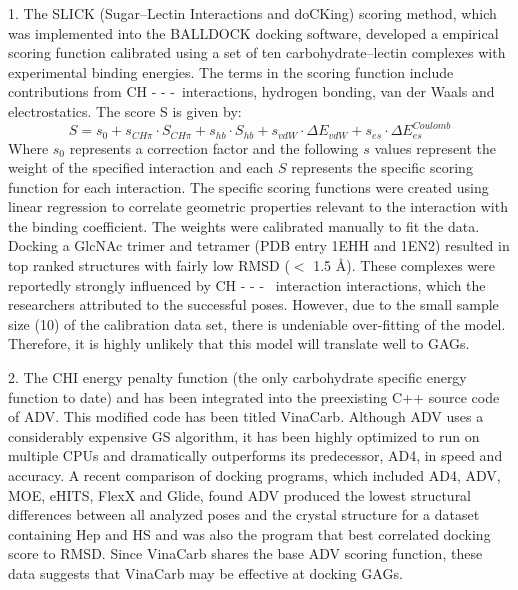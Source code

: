 \documentclass[journal=jctcce,manuscript=article]{achemso}
\begin{document}
{1. The SLICK (Sugar--Lectin Interactions and doCKing) scoring method, which was implemented into the BALLDOCK docking software, developed a empirical scoring function calibrated using a set of ten carbohydrate--lectin complexes with experimental binding energies.\cite{AndreasKerzmann2006SLICKInteractions, Kerzmann2008BALLDock/SLICK:Docking}
The terms in the scoring function include contributions from CH - - -\textpi~interactions, hydrogen bonding, van der Waals and electrostatics.\cite{Neumann2004ComputationalInteraction, AndreasKerzmann2006SLICKInteractions} The score S is given by:
\begin{equation} \label{eq:1}
S = s_0 + s_{CH\pi}\cdot S_{CH\pi} + s_{hb}\cdot S_{hb} + s_{vdW}\cdot \Delta E_{vdW} + s_{es}\cdot \Delta E_{es}^{Coulomb}
\end{equation}
Where $s_{0}$ represents a correction factor and the following $s$ values represent the weight of the specified interaction and each $S$ represents the specific scoring function for each interaction.\cite{AndreasKerzmann2006SLICKInteractions} The specific scoring functions were created using linear regression to correlate geometric properties relevant to the interaction with the binding coefficient.\cite{AndreasKerzmann2006SLICKInteractions, Kerzmann2008BALLDock/SLICK:Docking}
The weights were calibrated manually to fit the data.\cite{AndreasKerzmann2006SLICKInteractions}
Docking a GlcNAc trimer and tetramer (PDB entry 1EHH and 1EN2) resulted in top ranked structures with fairly low RMSD ($<$ 1.5 \AA).\cite{AndreasKerzmann2006SLICKInteractions, Kerzmann2008BALLDock/SLICK:Docking} 
These complexes were reportedly strongly influenced by CH - - - \textpi~interaction interactions, which the researchers attributed to the successful poses.\cite{AndreasKerzmann2006SLICKInteractions, Kerzmann2008BALLDock/SLICK:Docking}
However, due to the small sample size (10) of the calibration data set, there is undeniable over-fitting of the model.\cite{AndreasKerzmann2006SLICKInteractions, Kerzmann2008BALLDock/SLICK:Docking}
Therefore, it is highly unlikely that this model will translate well to \acp{GAG}.\cite{Samsonov2016ComputationalComplexes}

2. The \ac{CHI} energy penalty function (the only carbohydrate specific energy function to date) and has been integrated into the preexisting C++ source code of \ac{ADV}.\cite{Nivedha2015CarbohydrateChaff, Nivedha2016Vina-Carb:Docking} This modified code has been titled VinaCarb. Although \ac{ADV} uses a considerably expensive \ac{GS} algorithm, it has been highly optimized to run on multiple CPUs and dramatically outperforms its predecessor, \ac{AD4}, in speed and accuracy.\cite{Trott2010SoftwareMultithreading} A recent comparison of docking programs, which included \ac{AD4}, \ac{ADV}, MOE, eHITS, FlexX and Glide, found \ac{ADV} produced the lowest structural differences between all analyzed poses and the crystal structure for a dataset containing \ac{Hep} and \ac{HS} and was also the program that best correlated docking score to \ac{RMSD}.\cite{Samsonov2016ComputationalComplexes} Since VinaCarb shares the base \ac{ADV} scoring function, these data suggests that VinaCarb may be effective at docking \acp{GAG}.  

}
\end{document}
